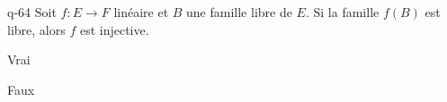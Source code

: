 \begin{truefalse}{q-64}
Soit $f : E \to F$ linéaire et $B$  une famille libre de $E$. Si la famille $f(B)$ est libre, alors $f$ est injective.
\item Vrai
\item* Faux
\end{truefalse}

